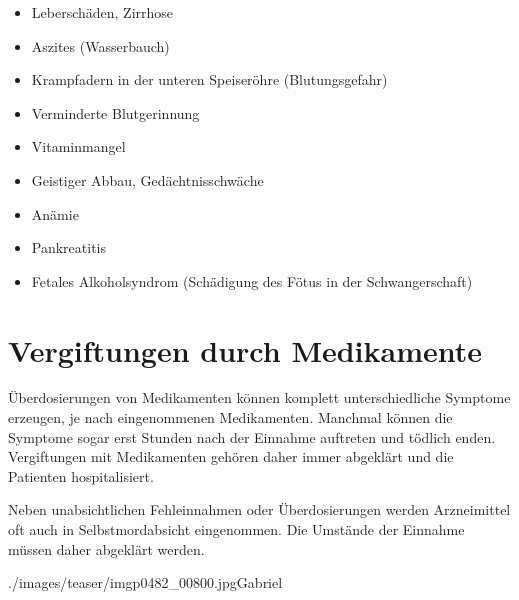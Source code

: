 {
\begin{itemize}
    \item Leberschäden, Zirrhose
    \item Aszites (Wasserbauch)
    \item Krampfadern in der unteren Speiseröhre  (Blutungsgefahr)
    \item Verminderte Blutgerinnung
    \item Vitaminmangel
    \item Geistiger Abbau, Gedächtnisschwäche
    \item Anämie
    \item Pankreatitis
    \item Fetales Alkoholsyndrom (Schädigung des Fötus in der Schwangerschaft)
    \cite{Jones1973,Guerri2009}
\end{itemize}
}{	

}{}{}{}













\section{Vergiftungen durch Medikamente}

{%
Überdosierungen von Medikamenten können komplett
unterschiedliche Symptome erzeugen, je nach eingenommenen
Medikamenten. Manchmal können die Symptome sogar erst Stunden
nach der Einnahme auftreten und tödlich enden. Vergiftungen
mit Medikamenten gehören daher immer abgeklärt und die
Patienten hospitalisiert. 

Neben unabsichtlichen Fehleinnahmen oder Überdosierungen
werden Arzneimittel oft auch in Selbstmordabsicht
eingenommen. Die Umstände der Einnahme müssen daher
abgeklärt werden.
}{

}{./images/teaser/imgp0482_00800.jpg}{}{Gabriel}


